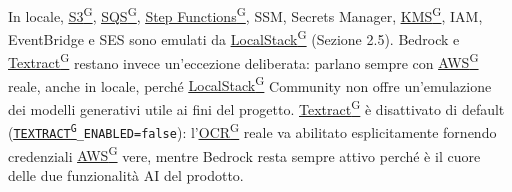 \documentclass[a4paper,12pt]{article}
\providecommand{\glslink}[2]{\href{https://alittlebyte-19.github.io/Documentazione/glossario.html\#gls-#1}{\underline{#2}\textsuperscript{\scriptsize G}}}
\begin{document}
In locale, \glslink{s3-simple-storage-service}{S3}, \glslink{sqs-simple-queue-service}{SQS}, \glslink{step-functions}{Step Functions}, SSM, Secrets Manager, \glslink{kms-key-management-service}{KMS}, IAM, EventBridge e SES sono emulati da \glslink{localstack}{LocalStack} (Sezione 2.5). Bedrock e \glslink{textract}{Textract} restano invece un'eccezione deliberata: parlano sempre con \glslink{aws}{AWS} reale, anche in locale, perché \glslink{localstack}{LocalStack} Community non offre un'emulazione dei modelli generativi utile ai fini del progetto. \glslink{textract}{Textract} è disattivato di default (\texttt{\glslink{textract}{TEXTRACT}\_ENABLED=false}): l'\glslink{ocr-riconoscimento-ottico-dei-caratteri}{OCR} reale va abilitato esplicitamente fornendo credenziali \glslink{aws}{AWS} vere, mentre Bedrock resta sempre attivo perché è il cuore delle due funzionalità AI del prodotto.
\end{document}

